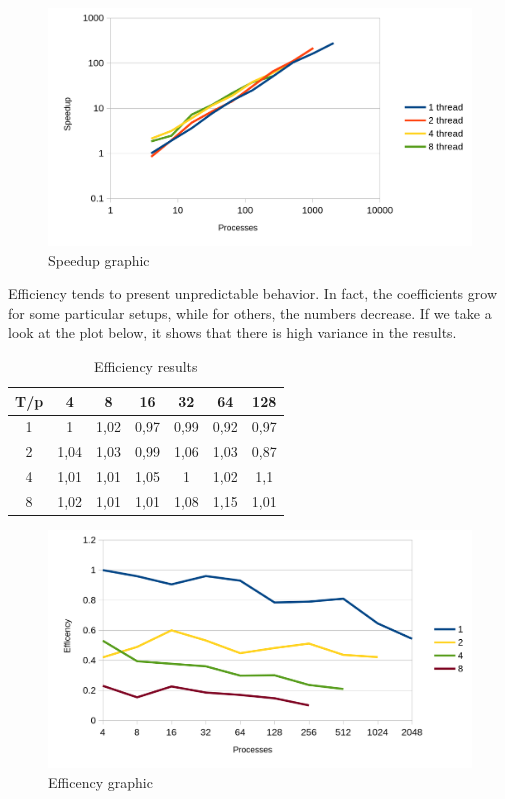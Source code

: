 \documentclass[10pt]{article}
\begin{document}
\begin{multicols}{2}
\begin{figure}[H]
  \includegraphics[scale=0.5]{img/speedup.jpg}
  \centering
  \caption{Speedup graphic}
\end{figure}

\noindent 
Efficiency tends to present unpredictable behavior.
In fact, the coefficients grow for some particular setups,
while for others, the numbers decrease. If we take a look at
the plot below, it shows that there is high variance in the results.
\begin{table}[H]
\centering
\begin{tabular}{| c | c | c | c | c | c | c |}
  \hline
  T/p & 4	 & 8	& 16	& 32	& 64 & 128  \\
  \hline
  1 & 1	& 1,02 & 0,97 & 0,99 & 0,92 & 0,97  \\
  2 & 1,04 & 1,03 & 0,99 & 1,06 & 1,03 & 0,87 \\	
  4 & 1,01	&1,01&	1,05&	1&	1,02&	1,1	\\	
  8 &1,02&	1,01&	1,01&	1,08&	1,15&	1,01 \\
  \hline
\end{tabular}
\caption{Efficiency results}
\label{efficiency_results}
\end{table}

\begin{figure}[H]
  \includegraphics[scale=0.5]{img/efficency.jpg}
  \centering
  \caption{Efficency graphic}
\end{figure}



\end{multicols}
\end{document}
